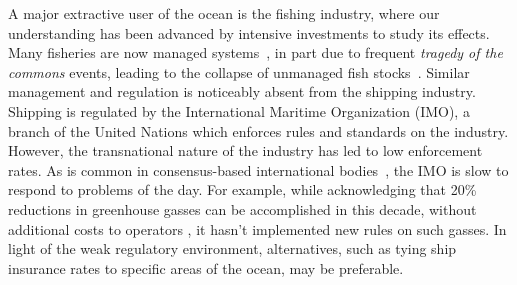 \documentclass[12pt,letterpaper]{article}
\begin{document}
A major extractive user of the ocean is the fishing industry, where our understanding has been advanced by intensive investments to study its effects. %
Many fisheries are now managed systems~\citep{worm2009rebuilding}, in part due to frequent \textit{tragedy of the commons} events, leading to the collapse of unmanaged fish stocks~\citep{costello2012status}. %
Similar management and regulation is noticeably absent from the shipping industry.
  Shipping is regulated by the International Maritime Organization (IMO), a branch of the United Nations which enforces rules and standards on the industry. However, the transnational nature of the industry has led to low enforcement rates. As is common in consensus-based international bodies~\citep{cogan2009representation}, the IMO is slow to respond to problems of the day. 
  For example, while acknowledging that 20\% reductions in greenhouse gasses can be accomplished in this decade, without additional costs to operators \citep{imo2009}, it hasn't implemented new rules on such gasses.  In light of the weak regulatory environment, alternatives, such as tying ship insurance rates to specific areas of the ocean, may be preferable.

\end{document}
